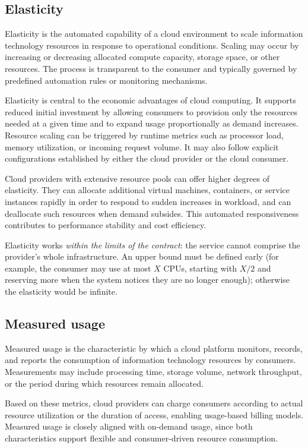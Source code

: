 \subsection{Elasticity}

Elasticity is the automated capability of a cloud environment to scale information technology resources in response to operational conditions. Scaling may occur by increasing or decreasing allocated compute capacity, storage space, or other resources. The process is transparent to the consumer and typically governed by predefined automation rules or monitoring mechanisms.

Elasticity is central to the economic advantages of cloud computing. It supports reduced initial investment by allowing consumers to provision only the resources needed at a given time and to expand usage proportionally as demand increases. Resource scaling can be triggered by runtime metrics such as processor load, memory utilization, or incoming request volume. It may also follow explicit configurations established by either the cloud provider or the cloud consumer.

Cloud providers with extensive resource pools can offer higher degrees of elasticity. They can allocate additional virtual machines, containers, or service instances rapidly in order to respond to sudden increases in workload, and can deallocate such resources when demand subsides. This automated responsiveness contributes to performance stability and cost efficiency.

Elasticity works \emph{within the limits of the contract}: the service cannot comprise the provider's whole infrastructure. An upper bound must be defined early (for example, the consumer may use at most $X$ CPUs, starting with $X/2$ and reserving more when the system notices they are no longer enough); otherwise the elasticity would be infinite.

\subsection{Measured usage}

Measured usage is the characteristic by which a cloud platform monitors, records, and reports the consumption of information technology resources by consumers. Measurements may include processing time, storage volume, network throughput, or the period during which resources remain allocated.

Based on these metrics, cloud providers can charge consumers according to actual resource utilization or the duration of access, enabling usage-based billing models. Measured usage is closely aligned with on-demand usage, since both characteristics support flexible and consumer-driven resource consumption.

